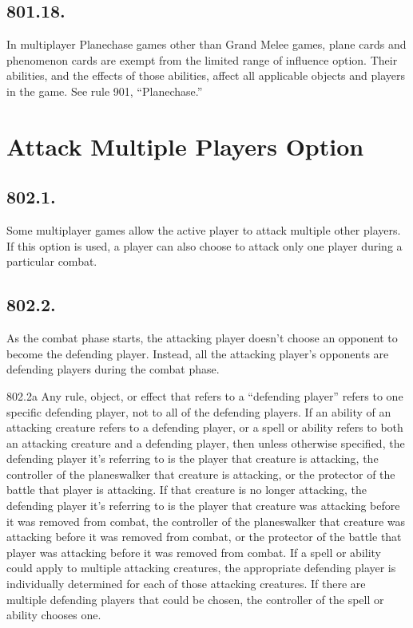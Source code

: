 \subsection*{801.18.}
In multiplayer Planechase games other than Grand Melee games, plane cards and phenomenon cards are exempt from the limited range of influence option. Their abilities, and the effects of those abilities, affect all applicable objects and players in the game. See rule 901, “Planechase.”

\section{Attack Multiple Players Option}
\subsection*{802.1.}
Some multiplayer games allow the active player to attack multiple other players. If this option is used, a player can also choose to attack only one player during a particular combat.

\subsection*{802.2.}
As the combat phase starts, the attacking player doesn’t choose an opponent to become the defending player. Instead, all the attacking player’s opponents are defending players during the combat phase.

802.2a Any rule, object, or effect that refers to a “defending player” refers to one specific defending player, not to all of the defending players. If an ability of an attacking creature refers to a defending player, or a spell or ability refers to both an attacking creature and a defending player, then unless otherwise specified, the defending player it’s referring to is the player that creature is attacking, the controller of the planeswalker that creature is attacking, or the protector of the battle that player is attacking. If that creature is no longer attacking, the defending player it’s referring to is the player that creature was attacking before it was removed from combat, the controller of the planeswalker that creature was attacking before it was removed from combat, or the protector of the battle that player was attacking before it was removed from combat. If a spell or ability could apply to multiple attacking creatures, the appropriate defending player is individually determined for each of those attacking creatures. If there are multiple defending players that could be chosen, the controller of the spell or ability chooses one.

